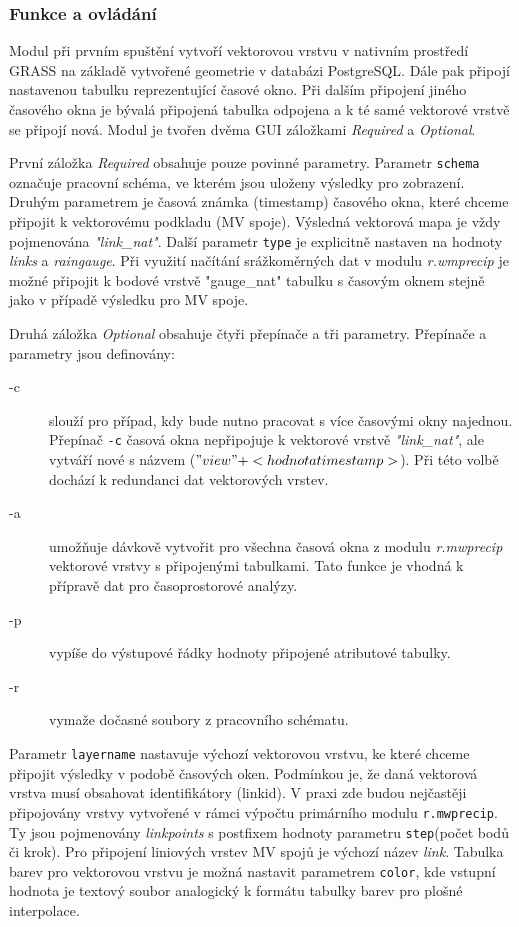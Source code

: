 \documentclass[a4paper,12pt,oneside]{report}
\begin{document}
\subsubsection{Funkce a ovládání}
Modul při prvním spuštění vytvoří vektorovou vrstvu v nativním
prostředí GRASS na základě vytvořené geometrie v databázi
PostgreSQL. Dále pak připojí nastavenou tabulku reprezentující časové
okno. Při dalším připojení jiného časového okna je bývalá připojená
tabulka odpojena a k té samé vektorové vrstvě se připojí nová. Modul
je tvořen dvěma GUI záložkami \textit{Required} a \textit{Optional}.

První záložka \textit{Required} obsahuje pouze povinné parametry.
Parametr \texttt{schema} označuje pracovní schéma, ve kterém jsou
uloženy výsledky pro zobrazení. Druhým parametrem je časová známka
(timestamp) časového okna, které chceme připojit k vektorovému
podkladu (MV spoje). Výsledná vektorová mapa je vždy pojmenována
\textit{"link\_nat"}. Další parametr \texttt{type} je explicitně
nastaven na hodnoty \emph{links} a \emph{raingauge}. Při využití
načítání srážkoměrných dat v modulu \textit{r.wmprecip} je možné
připojit k bodové vrstvě "gauge\_nat" tabulku s časovým oknem stejně
jako v případě výsledku pro MV spoje.

Druhá záložka \textit{Optional} obsahuje čtyři přepínače a tři
parametry.  Přepínače a parametry jsou definovány:
\begin{description}
\item[-c] slouží pro případ, kdy bude nutno pracovat s více časovými
  okny najednou. Přepínač \texttt{-c} časová okna nepřipojuje k
  vektorové vrstvě \textit{"link\_nat"}, ale vytváří nové s názvem
  ($"view" + <hodnota timestamp>$). Při této volbě dochází k
  redundanci dat vektorových vrstev.
\item[-a] umožňuje dávkově vytvořit pro všechna časová okna z modulu
  \textit{r.mwprecip} vektorové vrstvy s připojenými tabulkami. Tato
  funkce je vhodná k přípravě dat pro časoprostorové analýzy.
\item[-p] vypíše do výstupové řádky hodnoty připojené atributové
  tabulky.
\item[-r] vymaže dočasné soubory z pracovního schématu.
\end{description}


Parametr \texttt{layername} nastavuje výchozí vektorovou vrstvu, ke
které chceme při\-pojit výsledky v podobě časových oken. Podmínkou je,
že daná vektorová vrstva musí obsahovat identifikátory (linkid). V
praxi zde budou nejčastěji připojovány vrstvy vytvořené v rámci
výpočtu primárního modulu \texttt{r.mwprecip}. Ty jsou pojmenovány
\textit{linkpoints} s postfixem hodnoty parametru \texttt{step}(počet
bodů či krok). Pro připojení liniových vrstev MV spojů je výchozí
název \textit{link}.  Tabulka barev pro vektorovou vrstvu je možná
nastavit parametrem \texttt{color}, kde vstupní hodnota je textový
soubor analogický k formátu tabulky barev pro plošné interpolace.
\end{document}
